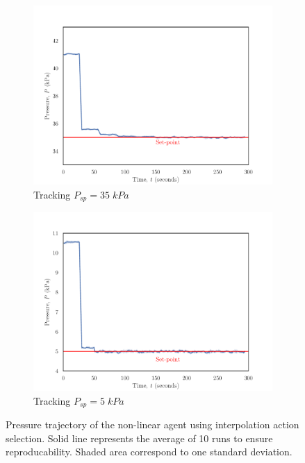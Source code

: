 \begin{figure}[H]
     \centering
     \begin{subfigure}{0.49\textwidth}
         \centering
         \includegraphics[width=\textwidth]{images/ch4/35SP_interpolation.pdf}
         \caption{Tracking $P_{sp} = 35 \; kPa$}
         \label{fig:system1_highsp3}
     \end{subfigure}
     \hfill
     \begin{subfigure}{0.49\textwidth}
         \centering
         \includegraphics[width=\textwidth]{images/ch4/5SP_interpolation.pdf}
         \caption{Tracking $P_{sp} = 5 \; kPa$}
         \label{fig:system1_lowsp3}
     \end{subfigure}
     \caption{Pressure trajectory of the non-linear agent using interpolation action selection. Solid line represents the average of 10 runs to ensure reproducability. Shaded area correspond to one standard deviation.}
\end{figure}












